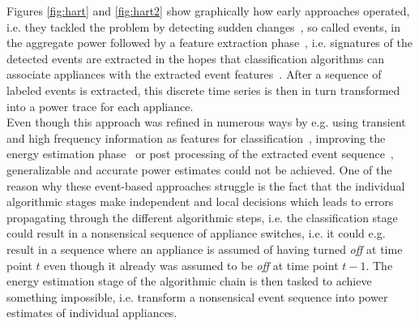 \documentclass[11pt]{cmuthesis} %
\begin{document}
 Figures \ref{fig:hart} and \ref{fig:hart2} show graphically how early approaches operated, i.e. they tackled the problem by detecting sudden changes~\cite{anderson2012event}, so called events, in the aggregate power followed by a feature extraction phase~\cite{patri2014extracting}, i.e. signatures of the detected events are extracted in the hopes that classification algorithms can associate appliances with the extracted event features~\cite{pereira2015semi}. After a sequence of labeled events is extracted, this discrete time series is then in turn transformed into a power trace for each appliance.\\
Even though this approach was refined in numerous ways by e.g. using transient and high frequency information as features for classification~\cite{norford1996non}, improving the energy estimation phase~\cite{giri2015energy} or post processing of the extracted event sequence~\cite{he2016non}, generalizable and accurate power estimates could not be achieved. One of the reason why these event-based approaches struggle is the fact that the individual algorithmic stages make independent and local decisions which leads to errors propagating through the different algorithmic steps, i.e. the classification stage could result in a nonsensical sequence of appliance switches, i.e. it could e.g. result in a sequence where an appliance is assumed of having turned \emph{off} at time point $t$ even though it already was assumed to be \emph{off} at time point $t-1$. The energy estimation stage of the algorithmic chain is then tasked to achieve something impossible, i.e. transform a nonsensical event sequence into power estimates of individual appliances.
\end{document}

